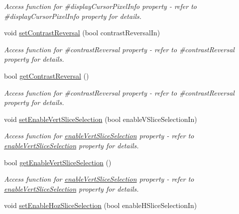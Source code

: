 \begin{DoxyCompactItemize}
\begin{DoxyCompactList}\small\item\em Access function for \#displayCursorPixelInfo property -\/ refer to \#displayCursorPixelInfo property for details. \end{DoxyCompactList}\item 
\hypertarget{classQEImage_aee4f148e897444cb51a222f63f6103c8}{
void \hyperlink{classQEImage_aee4f148e897444cb51a222f63f6103c8}{setContrastReversal} (bool contrastReversalIn)}
\label{classQEImage_aee4f148e897444cb51a222f63f6103c8}

\begin{DoxyCompactList}\small\item\em Access function for \#contrastReversal property -\/ refer to \#contrastReversal property for details. \end{DoxyCompactList}\item 
\hypertarget{classQEImage_a54cec5ec84eea3388755c03ab7ad61fe}{
bool \hyperlink{classQEImage_a54cec5ec84eea3388755c03ab7ad61fe}{getContrastReversal} ()}
\label{classQEImage_a54cec5ec84eea3388755c03ab7ad61fe}

\begin{DoxyCompactList}\small\item\em Access function for \#contrastReversal property -\/ refer to \#contrastReversal property for details. \end{DoxyCompactList}\item 
\hypertarget{classQEImage_ac4b5e468d50789179777514a9f5c8c0b}{
void \hyperlink{classQEImage_ac4b5e468d50789179777514a9f5c8c0b}{setEnableVertSliceSelection} (bool enableVSliceSelectionIn)}
\label{classQEImage_ac4b5e468d50789179777514a9f5c8c0b}

\begin{DoxyCompactList}\small\item\em Access function for \hyperlink{classQEImage_a740a4d76d07779009cc244dfc8543a85}{enableVertSliceSelection} property -\/ refer to \hyperlink{classQEImage_a740a4d76d07779009cc244dfc8543a85}{enableVertSliceSelection} property for details. \end{DoxyCompactList}\item 
\hypertarget{classQEImage_a125a3593175c41d6fd78546ecb560f40}{
bool \hyperlink{classQEImage_a125a3593175c41d6fd78546ecb560f40}{getEnableVertSliceSelection} ()}
\label{classQEImage_a125a3593175c41d6fd78546ecb560f40}

\begin{DoxyCompactList}\small\item\em Access function for \hyperlink{classQEImage_a740a4d76d07779009cc244dfc8543a85}{enableVertSliceSelection} property -\/ refer to \hyperlink{classQEImage_a740a4d76d07779009cc244dfc8543a85}{enableVertSliceSelection} property for details. \end{DoxyCompactList}\item 
\hypertarget{classQEImage_ab3ee880ea7a91feecf6d41967be8892b}{
void \hyperlink{classQEImage_ab3ee880ea7a91feecf6d41967be8892b}{setEnableHozSliceSelection} (bool enableHSliceSelectionIn)}
\label{classQEImage_ab3ee880ea7a91feecf6d41967be8892b}


\end{DoxyCompactItemize}
